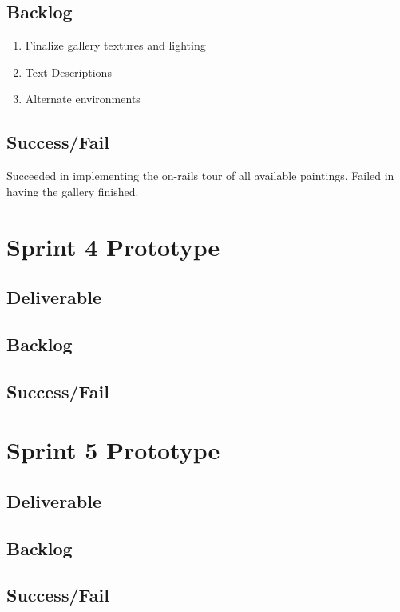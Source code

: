 \subsection{Backlog}
\begin{enumerate}
	\item Finalize gallery textures and lighting
	\item Text Descriptions
	\item Alternate environments
\end{enumerate}
\subsection{Success/Fail}
Succeeded in implementing the on-rails tour of all available paintings.  Failed in having the gallery finished.

\section{Sprint 4 Prototype}
\subsection{Deliverable}
\subsection{Backlog}
\subsection{Success/Fail}

\section{Sprint 5 Prototype}
\subsection{Deliverable}
\subsection{Backlog}
\subsection{Success/Fail}

